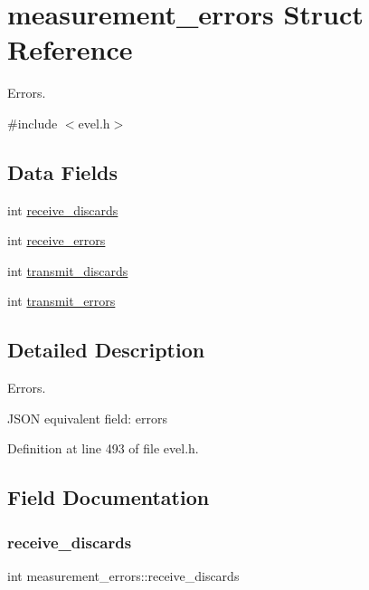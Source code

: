 \hypertarget{structmeasurement__errors}{}\section{measurement\+\_\+errors Struct Reference}
\label{structmeasurement__errors}


Errors.  




{\ttfamily \#include $<$evel.\+h$>$}

\subsection*{Data Fields}
\begin{DoxyCompactItemize}
\item 
int \hyperlink{structmeasurement__errors_abbfee9d727def0a99aed9fcf395f7aea}{receive\+\_\+discards}
\item 
int \hyperlink{structmeasurement__errors_a3200690b34fb94800164e5fd043a5f36}{receive\+\_\+errors}
\item 
int \hyperlink{structmeasurement__errors_a18f70f34aca47ed877e463921423448a}{transmit\+\_\+discards}
\item 
int \hyperlink{structmeasurement__errors_a91eb1e19af0e34ecfe551b560f36a4d5}{transmit\+\_\+errors}
\end{DoxyCompactItemize}


\subsection{Detailed Description}
Errors. 

J\+S\+ON equivalent field\+: errors 

Definition at line 493 of file evel.\+h.



\subsection{Field Documentation}
\hypertarget{structmeasurement__errors_abbfee9d727def0a99aed9fcf395f7aea}{}\label{structmeasurement__errors_abbfee9d727def0a99aed9fcf395f7aea} 
\subsubsection{\texorpdfstring{receive\+\_\+discards}{receive\_discards}}
{\footnotesize\ttfamily int measurement\+\_\+errors\+::receive\+\_\+discards}



